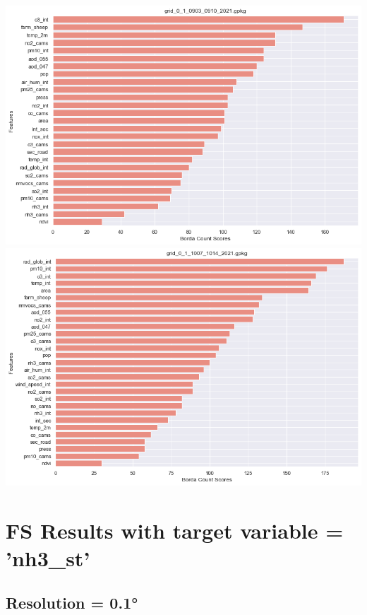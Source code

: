 \begin{center}
\includegraphics[width=.9\textwidth]{images/fs_results/pm25/01/no_montains/grid_0_1_0903_0910_2021.png}
\includegraphics[width=.9\textwidth]{images/fs_results/pm25/01/no_montains/grid_0_1_1007_1014_2021.png}
\end{center}

\section{FS Results with target variable = 'nh3\_st'  }
\subsection{Resolution = 0.1°}
